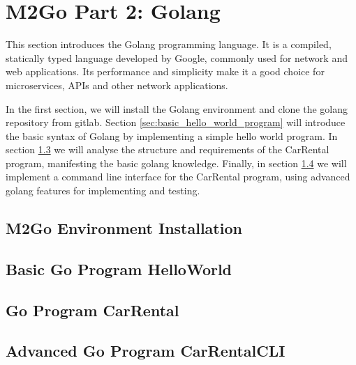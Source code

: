\chapter{M2Go Part 2: Golang}
\label{cha:golang}
This section introduces the Golang programming language.
It is a compiled, statically typed language developed by Google, commonly used for network and web applications.
Its performance and simplicity make it a good choice for microservices, APIs and other network applications.

In the first section, we will install the Golang environment and clone the golang repository from gitlab.
Section \ref{sec:basic_hello_world_program} will introduce the basic syntax of Golang by implementing a simple hello world program.
In section \ref{sec:go_program_car_rental} we will analyse the structure and requirements of the CarRental program, manifesting the basic golang knowledge.
Finally, in section \ref{sec:advanced_go_program_car_rental_cli} we will implement a command line interface for the CarRental program, using advanced golang features for implementing and testing.


\section{M2Go Environment Installation}
\label{sec:m2go_env_installation}




\section{Basic Go Program HelloWorld}
\label{sec:basic_go_program}



\section{Go Program CarRental}
\label{sec:go_program_car_rental}





\section{Advanced Go Program CarRentalCLI}
\label{sec:advanced_go_program_car_rental_cli}




